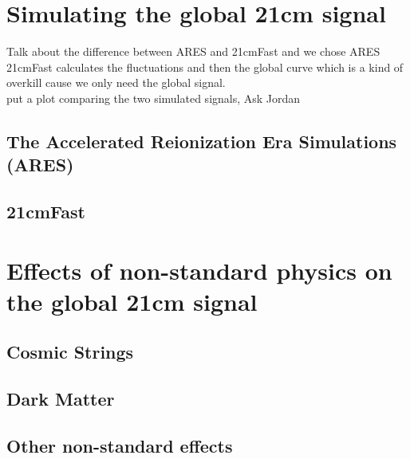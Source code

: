 \documentclass[12pt, TexShade, letterpaper]{report}
\begin{document}
\section{Simulating the global 21cm signal}
Talk about the difference between ARES and 21cmFast and we chose ARES\\
21cmFast calculates the fluctuations and then the global curve which is a kind of overkill cause we only need the global signal.\\
put a plot comparing the two simulated signals, Ask Jordan
\subsection{The Accelerated Reionization Era Simulations (ARES)}
\cite{ares2014jordan}
\subsection{21cmFast}
\cite{21cmfast_c}
\cite{21cmfast_python}
\section{Effects of non-standard physics on the global 21cm signal}
\label{chap:global21cm,sub:non_standard}
\subsection{Cosmic Strings}
\cite{cosmic_string_brandenberger} \cite{cosmic_string_oscar} \cite{WF_effect_oscar}
\subsection{Dark Matter}
\cite{constrain_dm_21} \cite{dark_cosmology_21} \cite{noncold_dm_21} \cite{snowmass_dm} \cite{dark_nature_21}
\subsection{Other non-standard effects}
\cite{ee_interaction_21}
\cite{neutrino_21}

\end{document}
